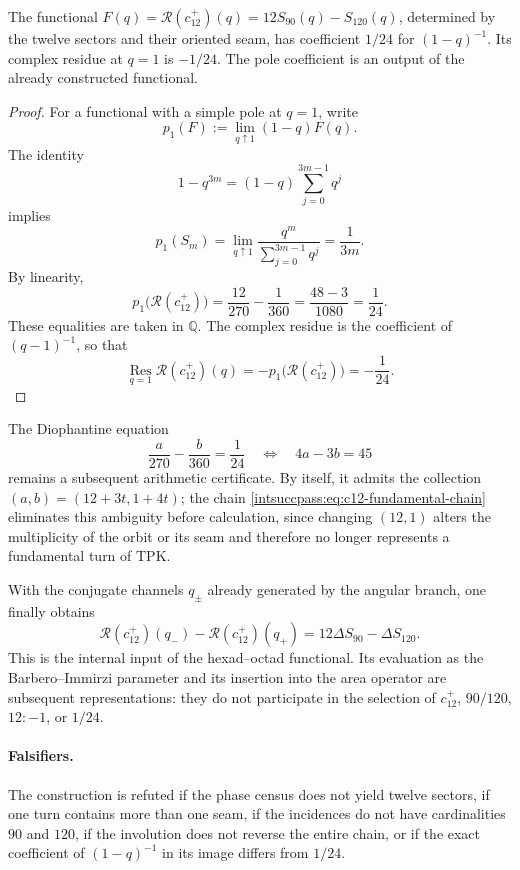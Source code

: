 \begin{theorem}
The functional \(F(q)=\mathscr R(c_{12}^{+})(q)
=12S_{90}(q)-S_{120}(q)\), determined by the twelve sectors
and their oriented seam, has coefficient \(1/24\) for
\((1-q)^{-1}\). Its complex residue at \(q=1\) is \(-1/24\).
The pole coefficient is an output of the already constructed functional.
\end{theorem}

\begin{proof}
For a functional with a simple pole at \(q=1\), write
\[
 p_1(F):=\lim_{q\uparrow1}(1-q)F(q).
\]
The identity
\[
 1-q^{3m}=(1-q)\sum_{j=0}^{3m-1}q^j
\]
implies
\[
 p_1(S_m)
 =\lim_{q\uparrow1}\frac{q^m}{\sum_{j=0}^{3m-1}q^j}
 =\frac1{3m}.
\]
By linearity,
\[
 p_1\bigl(\mathscr R(c_{12}^{+})\bigr)
 =\frac{12}{270}-\frac1{360}
 =\frac{48-3}{1080}=\frac1{24}.
\]
These equalities are taken in \(\mathbb Q\). The complex residue
is the coefficient of \((q-1)^{-1}\), so that
\[
 \operatorname*{Res}_{q=1}\mathscr R(c_{12}^{+})(q)
 =-p_1\bigl(\mathscr R(c_{12}^{+})\bigr)=-\frac1{24}.
\]
\end{proof}

The Diophantine equation
\[
 \frac a{270}-\frac b{360}=\frac1{24}
 \quad\Longleftrightarrow\quad
 4a-3b=45
\]
remains a subsequent arithmetic certificate. By itself, it admits the
collection \((a,b)=(12+3t,1+4t)\); the chain
\eqref{intsuccpass:eq:c12-fundamental-chain} eliminates this ambiguity before calculation,
since changing \((12,1)\) alters the multiplicity of the orbit or its seam
and therefore no longer represents a fundamental turn of TPK.

With the conjugate channels \(q_\pm\) already generated by the angular branch, one
finally obtains
\[
 \mathscr R(c_{12}^{+})(q_-)-
 \mathscr R(c_{12}^{+})(q_+)
 =12\Delta S_{90}-\Delta S_{120}.
\]
This is the internal input of the hexad--octad functional. Its evaluation
as the Barbero--Immirzi parameter and its insertion into the area operator are
subsequent representations: they do not participate in the selection of
\(c_{12}^{+}\), \(90/120\), \(12:-1\), or \(1/24\).

\paragraph{Falsifiers.}
The construction is refuted if the phase census does not yield twelve sectors, if
one turn contains more than one seam, if the incidences do not have
cardinalities \(90\) and \(120\), if the involution does not reverse the entire chain,
or if the exact coefficient of \((1-q)^{-1}\) in its image differs from \(1/24\).
